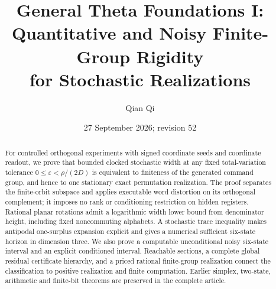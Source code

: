 \documentclass[11pt]{amsart}
\title[Quantitative and noisy finite-group rigidity]{General Theta Foundations I: \\
Quantitative and Noisy Finite-Group Rigidity\\
for Stochastic Realizations}
\author{Qian Qi}
\date{27 September 2026; revision 52}
\numberwithin{equation}{section}
\theoremstyle{definition}\newtheorem{definition}[theorem]{Definition}
\begin{document}
\begin{abstract}
For controlled orthogonal experiments with signed coordinate seeds and
coordinate readout, we prove that bounded clocked stochastic width at
any fixed total-variation tolerance $0\le\varepsilon<\rho/(2D)$ is
equivalent to finiteness of the generated command group, and hence to
one stationary exact permutation realization. The proof separates the
finite-orbit subspace and applies executable word distortion on its
orthogonal complement; it imposes no rank or conditioning restriction
on hidden registers. Rational planar rotations admit a logarithmic
width lower bound from denominator height, including fixed noncommuting
alphabets. A stochastic trace inequality makes antipodal one-surplus
expansion explicit and gives a numerical sufficient six-state horizon
in dimension three. We also prove a computable unconditional noisy
six-state interval and an explicit conditioned interval. Reachable
sections, a complete global residual certificate hierarchy, and a
priced rational finite-group realization connect the classification
to positive realization and finite computation. Earlier simplex,
two-state, arithmetic and finite-bit theorems are preserved in the
complete article.
\end{abstract}
\maketitle











\clearpage
\label{boundary:retained52}
\appendix





















\end{document}

